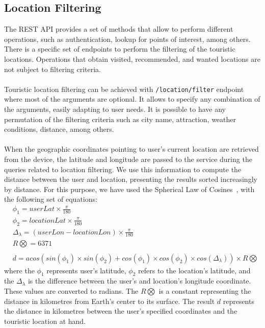 \subsection{Location Filtering}
\label{subsec:locationFiltering}
The REST API provides a set of methods that allow to perform different operations, such as authentication, lookup for points of interest, among others. There is a specific set of endpoints to perform the filtering of the touristic locations. Operations that obtain visited, recommended, and wanted locations are not subject to filtering criteria.\\
\\
Touristic location filtering can be achieved with \verb"/location/filter" endpoint where most of the arguments are optional. It allows to specify any combination of the arguments, easily adapting to user needs. It is possible to have any permutation of the filtering criteria such as city name, attraction, weather conditions, distance, among others.\\
\\
When the geographic coordinates pointing to user's current location are retrieved from the device, the latitude and longitude are passed to the service during the queries related to location filtering. We use this information to compute the distance between the user and location, presenting the results sorted increasingly by distance. For this purpose, we have used the Spherical Law of Cosines~\cite{sphericalCosine}, with the following set of equations:\\
\begin{equation}
  \begin{aligned}
    &\phi_{1} = userLat \times \frac{\pi}{180} \\
	&\phi_{2} = locationLat \times \frac{\pi}{180} \\
	&\Delta_\lambda = (userLon - locationLon) \times \frac{\pi}{180} \\
	&R\bigotimes = 6371\\
	\\
	&d = acos( sin(\phi_{1}) \times sin(\phi_{2}) + cos(\phi_{1}) \times cos(\phi_{2}) \times cos(\Delta_\lambda) ) \times R\bigotimes
  \end{aligned}
\end{equation}
where the $\phi_{1}$ represents user's latitude, $\phi_{2}$ refers to the location's latitude, and the $\Delta_\lambda$ is the difference between the user's and location's longitude coordinate. These values are converted to radians. The $R\bigotimes$ is a constant representing the distance in kilometres from Earth's center to its surface. The result $d$ represents the distance in kilometres between the user's specified coordinates and the touristic location at hand.

